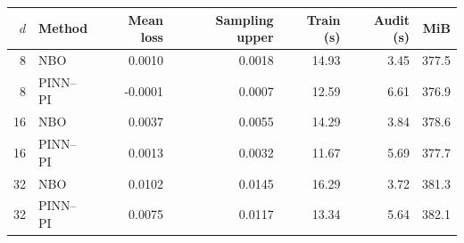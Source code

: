 \begin{tabular}{rlrrrrr}
\toprule
$d$ & Method & Mean loss & Sampling upper & Train (s) & Audit (s) & MiB \\
\midrule
8 & NBO & 0.0010 & 0.0018 & 14.93 & 3.45 & 377.5 \\
8 & PINN--PI & -0.0001 & 0.0007 & 12.59 & 6.61 & 376.9 \\
16 & NBO & 0.0037 & 0.0055 & 14.29 & 3.84 & 378.6 \\
16 & PINN--PI & 0.0013 & 0.0032 & 11.67 & 5.69 & 377.7 \\
32 & NBO & 0.0102 & 0.0145 & 16.29 & 3.72 & 381.3 \\
32 & PINN--PI & 0.0075 & 0.0117 & 13.34 & 5.64 & 382.1 \\
\bottomrule
\end{tabular}
